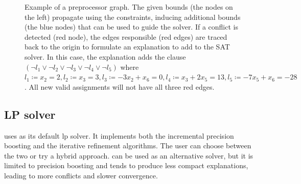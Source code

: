 \documentclass[runningheads]{llncs}
\begin{document}
\begin{figure}[h]
    \caption{Example of a preprocessor graph. The given bounds (the nodes on the left) propagate using the constraints, inducing additional bounds (the blue nodes) that can be used to guide the solver.
        If a conflict is detected (red node), the edges responsible (red edges) are traced back to the origin to formulate an explanation to add to the SAT solver.
        In this case, the explanation adds the clause $(\neg l_1 \lor \neg l_2 \lor \neg l_3 \lor \neg l_4 \lor \neg l_5)$ where $l_1 \coloneqq x_2 = 2, l_2 \coloneqq x_3 = 3, l_3 \coloneqq -3x_2 + x_6 = 0, l_4 \coloneqq x_3 + 2x_5 = 13, l_5 \coloneqq -7x_5 + x_6 = -28$.
        All new valid assignments will not have all three red edges.}
    \label{dg:preprocessor}
\end{figure}

\subsection{LP solver}

\dlinear uses \soplex as its default \gls{lp} solver.
It implements both the incremental precision boosting and the iterative refinement algorithms.
The user can choose between the two or try a hybrid approach.
\qsoptex can be used as an alternative solver, but it is limited to precision boosting and tends to produce less compact explanations, leading to more conflicts and slower convergence.
\end{document}
